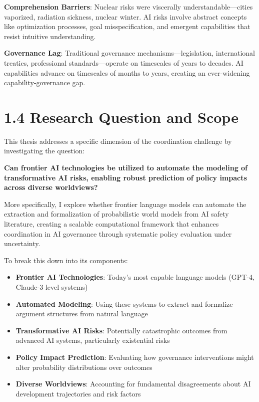 \documentclass[
  11pt,
  letterpaper,
]{book}
\providecommand{\tightlist}{%
  \setlength{\itemsep}{0pt}\setlength{\parskip}{0pt}}
\begin{document}
\textbf{Comprehension Barriers}: Nuclear risks were viscerally
understandable---cities vaporized, radiation sickness, nuclear winter.
AI risks involve abstract concepts like optimization processes, goal
misspecification, and emergent capabilities that resist intuitive
understanding.

\textbf{Governance Lag}: Traditional governance
mechanisms---legislation, international treaties, professional
standards---operate on timescales of years to decades. AI capabilities
advance on timescales of months to years, creating an ever-widening
capability-governance gap.

\section{1.4 Research Question and
Scope}\label{research-question-and-scope}

This thesis addresses a specific dimension of the coordination challenge
by investigating the question:

\textbf{Can frontier AI technologies be utilized to automate the
modeling of transformative AI risks, enabling robust prediction of
policy impacts across diverse worldviews?}

More specifically, I explore whether frontier language models can
automate the extraction and formalization of probabilistic world models
from AI safety literature, creating a scalable computational framework
that enhances coordination in AI governance through systematic policy
evaluation under uncertainty.

To break this down into its components:

\begin{itemize}
\tightlist
\item
  \textbf{Frontier AI Technologies}: Today's most capable language
  models (GPT-4, Claude-3 level systems)
\item
  \textbf{Automated Modeling}: Using these systems to extract and
  formalize argument structures from natural language
\item
  \textbf{Transformative AI Risks}: Potentially catastrophic outcomes
  from advanced AI systems, particularly existential risks
\item
  \textbf{Policy Impact Prediction}: Evaluating how governance
  interventions might alter probability distributions over outcomes
\item
  \textbf{Diverse Worldviews}: Accounting for fundamental disagreements
  about AI development trajectories and risk factors
\end{itemize}
\end{document}
